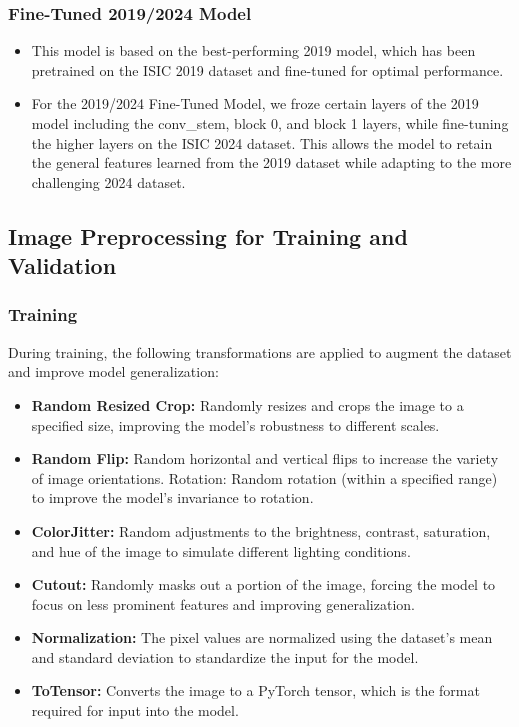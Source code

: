 \documentclass{article}
\begin{document}
\subsubsection{Fine-Tuned 2019/2024 Model}

\begin{itemize}

\item This model is based on the best-performing 2019 model, which has been pretrained on the ISIC 2019
dataset and fine-tuned for optimal performance.
\item For the 2019/2024 Fine-Tuned Model, we froze certain layers of the 2019 model including the
conv\_stem, block 0, and block 1 layers, while fine-tuning the higher layers on the ISIC 2024 dataset.
This allows the model to retain the general features learned from the 2019 dataset while adapting to the
more challenging 2024 dataset.

\end{itemize}

\subsection{Image Preprocessing for Training and Validation}

\subsubsection{Training}

During training, the following transformations are applied to augment the dataset and improve model
generalization:

\begin{itemize}


\item \textbf{Random Resized Crop:} Randomly resizes and crops the image to a specified size, improving the
model's robustness to different scales.
\item \textbf{Random Flip:} Random horizontal and vertical flips to increase the variety of image orientations.
Rotation: Random rotation (within a specified range) to improve the model's invariance to rotation.
\item \textbf{ColorJitter:} Random adjustments to the brightness, contrast, saturation, and hue of the image to
simulate different lighting conditions.
\item \textbf{Cutout:} Randomly masks out a portion of the image, forcing the model to focus on less prominent
features and improving generalization.
\item \textbf{Normalization:} The pixel values are normalized using the dataset's mean and standard deviation to
standardize the input for the model.
\item \textbf{ToTensor:} Converts the image to a PyTorch tensor, which is the format required for input into the
model.

\end{itemize}
\end{document}
